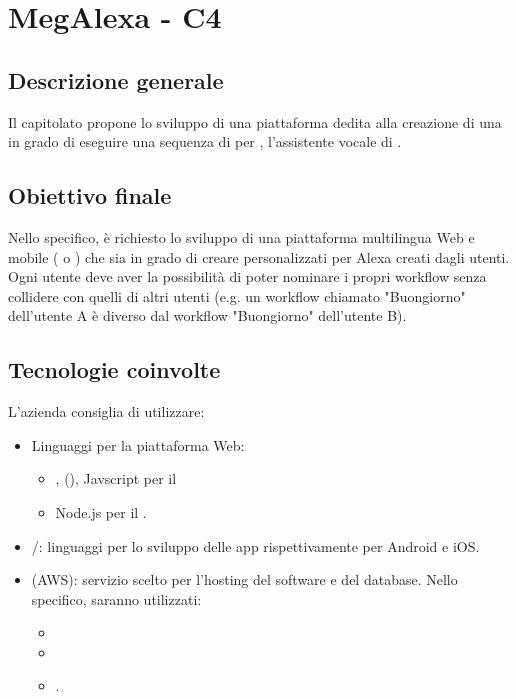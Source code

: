 \section{MegAlexa - C4} \label{c4}

    \subsection{Descrizione generale}
    Il capitolato propone lo sviluppo di una piattaforma
    dedita alla creazione di una  in grado di eseguire una sequenza
    di  per , l'assistente vocale di .

    \subsection{Obiettivo finale}
    Nello specifico, \`e richiesto lo sviluppo di una piattaforma multilingua Web e
    mobile ( o ) che sia in grado di
    creare  personalizzati per Alexa creati dagli utenti. Ogni utente
    deve aver la possibilit\`a di poter nominare i propri workflow senza collidere con
    quelli di altri utenti (e.g. un workflow chiamato "Buongiorno" dell'utente A \`e
    diverso dal workflow "Buongiorno" dell'utente B).

    \subsection{Tecnologie coinvolte}
    L'azienda consiglia di utilizzare:
    \begin{itemize}
    	\item Linguaggi per la piattaforma Web:
    	\begin{itemize}
            \item {},  (), Javscript
                per il 
            \item Node.js per il .
    	\end{itemize}
        \item {}/: linguaggi per lo sviluppo delle app
            rispettivamente per Android e iOS.
        \item {} (AWS): servizio scelto per l'hosting del software e del database.
            Nello specifico, saranno utilizzati:
            \begin{itemize}
                \item {}
                \item {}
                \item {}.
            \end{itemize}
    \end{itemize}

